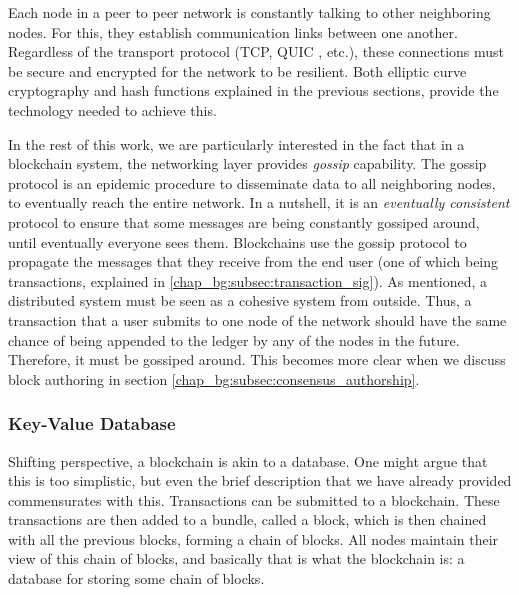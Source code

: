 Each node in a peer to peer network is constantly talking to other neighboring nodes. For this, they
establish communication links between one another. Regardless of the transport protocol (TCP, QUIC
\cite{carlucciHTTPUDPExperimental2015}, etc.), these connections must be secure and encrypted for
the network to be resilient. Both elliptic curve cryptography and hash functions explained in the
previous sections, provide the technology needed to achieve this.

In the rest of this work, we are particularly interested in the fact that in a blockchain system,
the networking layer provides \textit{gossip} capability. The gossip protocol is an epidemic
procedure to disseminate data to all neighboring nodes, to eventually reach the entire network. In a
nutshell, it is an \textit{eventually consistent} protocol to ensure that some messages are being
constantly gossiped around, until eventually everyone sees them. Blockchains use the gossip protocol
to propagate the messages that they receive from the end user (one of which being transactions,
explained in \ref{chap_bg:subsec:transaction_sig}). As mentioned, a distributed system must be seen
as a cohesive system from outside. Thus, a transaction that a user submits to one node of the
network should have the same chance of being appended to the ledger by any of the nodes in the
future. Therefore, it must be gossiped around. This becomes more clear when we discuss block
authoring in section \ref{chap_bg:subsec:consensus_authorship}.

\subsubsection{Key-Value Database} \label{chap_bg:subsec:kvdb}

Shifting perspective, a blockchain is akin to a database. One might argue that this is too
simplistic, but even the brief description that we have already provided commensurates with this.
Transactions can be submitted to a blockchain. These transactions are then added to a bundle, called
a block, which is then chained with all the previous blocks, forming a chain of blocks. All nodes
maintain their view of this chain of blocks, and basically that is what the blockchain is: a
database for storing some chain of blocks.

